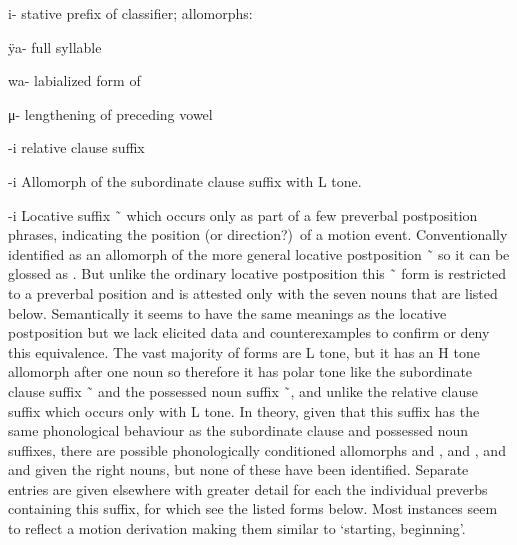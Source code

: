 \begin{morphdesc}[resume*=alphalist]
\item[i-]\label{m:i-stv}
	stative prefix of classifier;
	\newline
	allomorphs:
	\begin{allolist}
	\item[ÿa-]	full syllable
	\item[wa-]	labialized form of 
	\item[μ-]	lengthening of preceding vowel
	\end{allolist}

\item[-i]\label{m:-i-rel}
	relative clause suffix

\item[-i]\label{m:-i-sub}
	Allomorph of the subordinate clause suffix  with L tone.

\item[-i]\label{m:-i-loc}
	Locative suffix  \~\  which occurs only as part of a few preverbal postposition
		phrases, indicating the position (or direction?)\ of a motion event.
	Conventionally identified as an allomorph of the more general locative postposition
		 \~\  \parencites[33, 134, 138, 301]{leer:1991}
		so it can be glossed as .
	But unlike the ordinary locative postposition this  \~\  form is restricted to a
		preverbal position and is attested only with the seven nouns that are listed below.
	Semantically it seems to have the same meanings as the locative postposition but we lack
		elicited data and counterexamples to confirm or deny this equivalence.
	The vast majority of forms are L tone, but it has an H tone allomorph after one noun so
		therefore it has polar tone
		like the subordinate clause suffix  \~\ 
		and the possessed noun suffix  \~\ ,
		and unlike the relative clause suffix  which occurs only with L tone.
	In theory, given that this suffix has the same phonological behaviour as the subordinate clause
		and possessed noun suffixes, there are possible phonologically conditioned allomorphs
		 and ,  and , and  and 
		given the right nouns, but none of these have been identified.
	Separate entries are given elsewhere with greater detail for each the individual preverbs
		containing this suffix, for which see the listed forms below.
	Most instances seem to reflect a motion derivation
		making them similar to  ‘starting, beginning’.
	\newline

\end{morphdesc}

